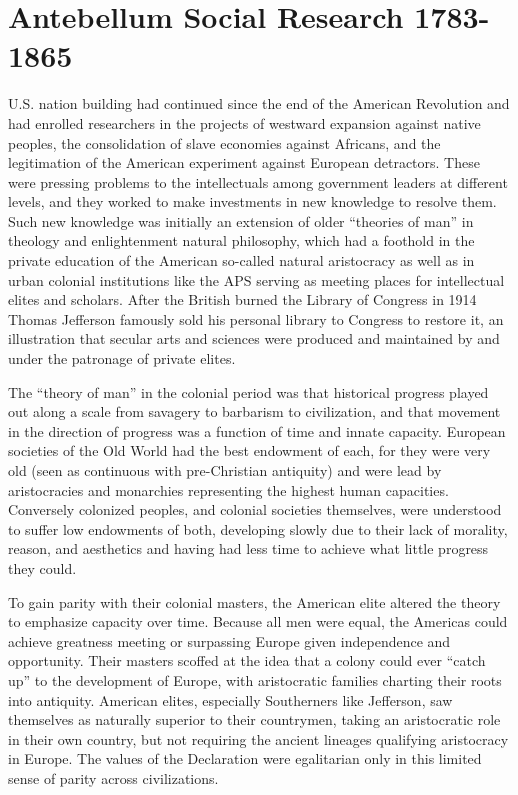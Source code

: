 \documentclass[]{book}
\begin{document}
\section{Antebellum Social Research
1783-1865}\label{antebellum-social-research-1783-1865}

U.S. nation building had continued since the end of the American
Revolution and had enrolled researchers in the projects of westward
expansion against native peoples, the consolidation of slave economies
against Africans, and the legitimation of the American experiment
against European detractors. These were pressing problems to the
intellectuals among government leaders at different levels, and they
worked to make investments in new knowledge to resolve them. Such new
knowledge was initially an extension of older ``theories of man'' in
theology and enlightenment natural philosophy, which had a foothold in
the private education of the American so-called natural aristocracy as
well as in urban colonial institutions like the APS serving as meeting
places for intellectual elites and scholars. After the British burned
the Library of Congress in 1914 Thomas Jefferson famously sold his
personal library to Congress to restore it, an illustration that secular
arts and sciences were produced and maintained by and under the
patronage of private elites.

The ``theory of man'' in the colonial period was that historical
progress played out along a scale from savagery to barbarism to
civilization, and that movement in the direction of progress was a
function of time and innate capacity. European societies of the Old
World had the best endowment of each, for they were very old (seen as
continuous with pre-Christian antiquity) and were lead by aristocracies
and monarchies representing the highest human capacities. Conversely
colonized peoples, and colonial societies themselves, were understood to
suffer low endowments of both, developing slowly due to their lack of
morality, reason, and aesthetics and having had less time to achieve
what little progress they could.

To gain parity with their colonial masters, the American elite altered
the theory to emphasize capacity over time. Because all men were equal,
the Americas could achieve greatness meeting or surpassing Europe given
independence and opportunity. Their masters scoffed at the idea that a
colony could ever ``catch up'' to the development of Europe, with
aristocratic families charting their roots into antiquity. American
elites, especially Southerners like Jefferson, saw themselves as
naturally superior to their countrymen, taking an aristocratic role in
their own country, but not requiring the ancient lineages qualifying
aristocracy in Europe. The values of the Declaration were egalitarian
only in this limited sense of parity across civilizations.
\end{document}
